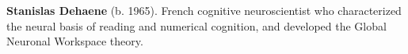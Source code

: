 \textbf{Stanislas Dehaene} (b. 1965). French cognitive neuroscientist who characterized the neural basis of reading and numerical cognition, and developed the Global Neuronal Workspace theory.


